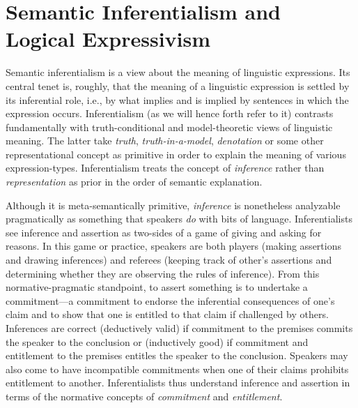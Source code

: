 \documentclass{article}
\date{}
\begin{document}
\setlength{\parindent}{1cm}
\large
\doublespacing




\section{Semantic Inferentialism and Logical Expressivism}


Semantic inferentialism is a view about the meaning of linguistic expressions. Its central tenet is, roughly, that the meaning of a linguistic expression is settled by its inferential role, i.e., by what implies and is implied by sentences in which the expression occurs. Inferentialism (as we will hence forth refer to it) contrasts fundamentally with truth-conditional and model-theoretic views of linguistic meaning. The latter take \textit{truth}, \textit{truth-in-a-model}, \textit{denotation} or some other representational concept as primitive in order to explain the meaning of various expression-types. Inferentialism treats the concept of \textit{inference} rather than \textit{representation} as prior in the order of semantic explanation.

Although it is meta-semantically primitive, \textit{inference} is nonetheless analyzable pragmatically as something that speakers \textit{do} with bits of language. Inferentialists see inference and assertion as two-sides of a game of giving and asking for reasons. In this game or practice, speakers are both players (making assertions and drawing inferences) and referees (keeping track of other's assertions and determining whether they are observing the rules of inference). From this normative-pragmatic standpoint, to assert something is to undertake a commitment---a commitment to endorse the inferential consequences of one's claim and to show that one is entitled to that claim if challenged by others. Inferences are correct (deductively valid) if commitment to the premises commits the speaker to the conclusion or (inductively good) if commitment and entitlement to the premises entitles the speaker to the conclusion. Speakers may also come to have incompatible commitments when one of their claims prohibits entitlement to another. Inferentialists thus understand inference and assertion in terms of the normative concepts of \textit{commitment} and \textit{entitlement}.
	
\end{document}
